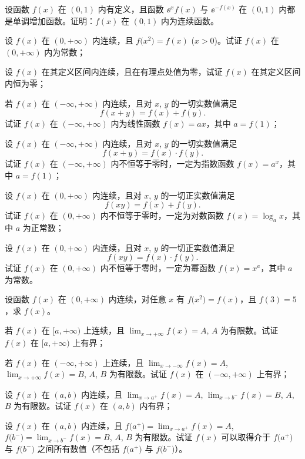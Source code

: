 	\begin{ti}
		设函数 $f(x)$ 在 $(0,1)$ 内有定义，且函数 $\ee^x f(x)$ 与 $\ee^{-f(x)}$ 在 $(0,1)$ 内都是单调增加函数。证明：$f(x)$ 在 $(0,1)$ 内为连续函数。
	\end{ti}

	\begin{ti}
		\begin{xiaoti}
			\item 设 $f(x)$ 在 $(0,+\infty)$ 内连续，且 $f\bigl(x^2\bigr) = f(x)$ ($x>0$)。试证 $f(x)$ 在 $(0,+\infty)$ 内为常数；
			\item 设 $f(x)$ 在其定义区间内连续，且在有理点处值为零，试证 $f(x)$ 在其定义区间内恒为零；
			\item 若 $f(x)$ 在 $(-\infty,+\infty)$ 内连续，且对 $x$, $y$ 的一切实数值满足
			\[ f(x+y) = f(x) + f(y). \]
			试证 $f(x)$ 在 $(-\infty,+\infty)$ 内为线性函数 $f(x) = ax$，其中 $a = f(1)$；
			\item 设 $f(x)$ 在 $(-\infty,+\infty)$ 内连续，且对 $x$, $y$ 的一切实数值满足
			\[ f(x+y) = f(x) \cdot f(y). \]
			试证 $f(x)$ 在 $(-\infty,+\infty)$ 内不恒等于零时，一定为指数函数 $f(x) = a^x$，其中 $a=f(1)$；
			\item 设 $f(x)$ 在 $(0,+\infty)$ 内连续，且对 $x$, $y$ 的一切正实数值满足
			\[ f(xy) = f(x) + f(y). \]
			试证 $f(x)$ 在 $(0,+\infty)$ 内不恒等于零时，一定为对数函数 $f(x) = \log_a x$，其中 $a$ 为正常数；
			\item 设 $f(x)$ 在 $(0,+\infty)$ 内连续，且对 $x$, $y$ 的一切正实数值满足
			\[ f(xy) = f(x) \cdot f(y). \]
			试证 $f(x)$ 在 $(0,+\infty)$ 内不恒等于零时，一定为幂函数 $f(x) = x^a$，其中 $a$ 为常数。
		\end{xiaoti}
		\begin{bianshi}
			设函数 $f(x)$ 在 $(0,+\infty)$ 内连续，对任意 $x$ 有 $f\bigl( x^2 \bigr) = f(x)$，且 $f(3) = 5$，求 $f(x)$。
		\end{bianshi}
	\end{ti}

	\begin{ti}
		\begin{xiaoti}
			\item 若 $f(x)$ 在 $[a,+\infty)$ 上连续，且 $\lim_{x \to +\infty} f(x) = A$, $A$ 为有限数。试证 $f(x)$ 在 $[a,+\infty)$ 上有界；
			\item 若 $f(x)$ 在 $(-\infty,+\infty)$ 上连续，且 $\lim_{x \to -\infty} f(x) = A$, $\lim_{x \to +\infty} f(x) = B$, $A$, $B$ 为有限数。试证 $f(x)$ 在 $(-\infty,+\infty)$ 上有界；
			\item 设 $f(x)$ 在 $(a,b)$ 内连续，且 $\lim_{x \to a^+} f(x) = A$, $\lim_{x \to b^-} f(x) = B$, $A$, $B$ 为有限数。试证 $f(x)$ 在 $(a,b)$ 内有界；
			\item 设 $f(x)$ 在 $(a,b)$ 内连续，且 $f\bigl( a^+ \bigr) = \lim_{x \to a^+} f(x) = A$, $f\bigl( b^- \bigr) = \lim_{x \to b^-} f(x) = B$, $A$, $B$ 为有限数。试证 $f(x)$ 可以取得介于 $f\bigl( a^+ \bigr)$ 与 $f\bigl( b^- \bigr)$ 之间所有数值（不包括 $f\bigl( a^+ \bigr)$ 与 $f\bigl( b^- \bigr)$）。
		\end{xiaoti}
	\end{ti}

